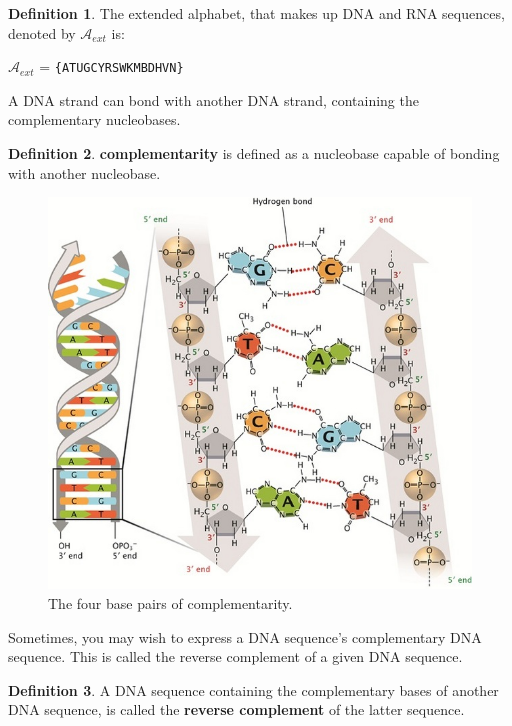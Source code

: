 \documentclass[12pt]{article}
\theoremstyle{definition}
\newtheorem{mydef}{Definition}
\begin{document}
\begin{mydef}
The extended alphabet, that makes up DNA and RNA sequences, denoted by $\mathcal{A}_{ext}$ is:
\begin{center}
$\mathcal{A}_{ext}$ = \texttt{\{ATUGCYRSWKMBDHVN\}}
\end{center}
\end{mydef}

A DNA strand can bond with another DNA strand, containing the complementary nucleobases.

\begin{mydef}
\textbf{complementarity} is defined as a nucleobase capable of bonding with another nucleobase.
\end{mydef}

\begin{figure}[H]
	\label{Complementarity}
	\begin{center}
		\includegraphics[scale=2.5]{complementarity.jpg}	
	\end{center}
	\caption{The four base pairs of complementarity.\cite{DNA-nature}}
\end{figure}

Sometimes, you may wish to express a DNA sequence's complementary DNA sequence. This is called the reverse complement of a given DNA sequence.

\begin{mydef}
A DNA sequence containing the complementary bases of another DNA sequence, is called the \textbf{reverse complement} of the latter sequence.
\end{mydef}
\end{document}
